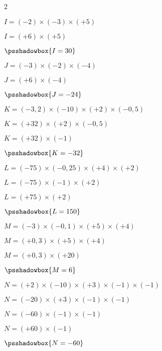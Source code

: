 \begin{corrige}
    \phantom{rrr}
    \begin{multicols}2
    \begin{list}{}{}
        \item $I = (-2)\times (-3)\times (+5) $
        \item $I = (+6)\times (+5) $
        \item $\psshadowbox{I = 30} $
        \item 
        \item $J = (-3)\times (-2)\times (-4) $
        \item $J = (+6)\times (-4) $
        \item $\psshadowbox{J = -24} $
        \item 
        \item $K = (-3,2)\times (-10)\times (+2)\times (-0,5) $
        \item $K = (+32)\times (+2)\times (-0,5) $
        \item $K = (+32)\times (-1) $
        \item $\psshadowbox{K = -32} $
        \columnbreak
        \item $L = (-75)\times (-0,25)\times (+4)\times (+2) $
        \item $L = (-75)\times (-1)\times (+2) $
        \item $L = (+75)\times (+2) $
        \item $\psshadowbox{L = 150} $
        \item 
        \item $M = (-3)\times (-0,1)\times (+5)\times (+4) $
        \item $M = (+0,3)\times (+5)\times (+4) $
        \item $M = (+0,3)\times (+20) $
        \item $\psshadowbox{M = 6} $
        \item 
        \item $N = (+2)\times (-10)\times (+3)\times (-1)\times (-1) $
        \item $N = (-20)\times (+3)\times (-1)\times (-1) $
        \item $N = (-60)\times (-1)\times (-1) $
        \item $N = (+60)\times (-1) $
        \item $\psshadowbox{N = -60} $
    \end{list}
\end{multicols}
\end{corrige}

